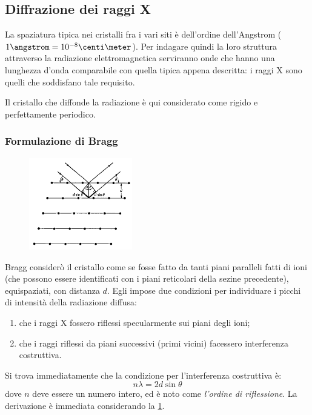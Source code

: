 \subsection{Diffrazione dei raggi X}

La spaziatura tipica nei cristalli fra i vari siti è dell'ordine dell'Angstrom ($ 1\angstrom = 10^{-8} \centi\meter $).
Per indagare quindi la loro struttura attraverso la radiazione elettromagnetica serviranno onde che hanno una lunghezza d'onda comparabile con quella tipica appena descritta: i raggi X sono quelli che soddisfano tale requisito.

Il cristallo che diffonde la radiazione è qui considerato come rigido e perfettamente periodico.

\subsubsection{Formulazione di Bragg}

\begin{figure}
	\vspace{-20pt}
	\centering
	\includegraphics[width=0.4\textwidth]{Immagini/BraggXRay.png}
	\caption{}
	\label{fig:braggX}
	\vspace{-10pt}
\end{figure}

Bragg considerò il cristallo come se fosse fatto da tanti piani paralleli fatti di ioni (che possono essere identificati con i piani reticolari della sezine precedente), equispaziati, con distanza $ d $.
Egli impose due condizioni per individuare i picchi di intensità della radiazione diffusa:
\begin{enumerate}
	\item che i raggi X fossero riflessi specularmente sui piani degli ioni;
	\item che i raggi riflessi da piani successivi (primi vicini) facessero interferenza costruttiva.
\end{enumerate}

Si trova immediatamente che la condizione per l'interferenza costruttiva è:
\[ n\lambda = 2 d \sin\theta \]
dove $ n $ deve essere un numero intero, ed è noto come \textit{l'ordine di riflessione}. La derivazione è immediata considerando la \cref{fig:braggX}.

